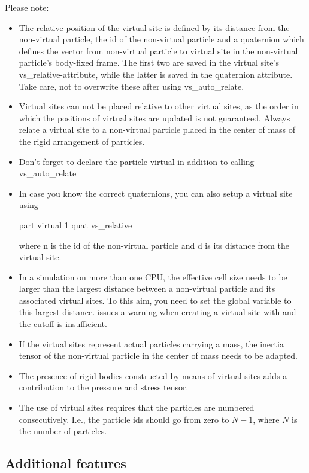 Please note:
\begin{itemize}
\item The relative position of the virtual site is defined by its
  distance from the non-virtual particle, the id of the non-virtual
  particle and a quaternion which defines the vector from non-virtual
  particle to virtual site in the non-virtual particle's body-fixed
  frame. The first two are saved in the virtual site's
  vs\_relative-attribute, while the latter is saved in the quaternion
  attribute. Take care, not to overwrite these after using
  vs\_auto\_relate.
\item Virtual sites can not be placed relative to other virtual sites,
  as the order in which the positions of virtual sites are updated is
  not guaranteed. Always relate a virtual site to a non-virtual
  particle placed in the center of mass of the rigid arrangement of
  particles.
\item Don't forget to declare the particle virtual in addition to
  calling vs\_auto\_relate
\item In case you know the correct quaternions, you can also setup a
  virtual site using
  \begin{essyntaxbox}
    part  virtual 1 quat  vs\_relative  
  \end{essyntaxbox}
  where n is the id of the non-virtual particle and d is its distance
  from the virtual site.
\item In a simulation on more than one CPU, the effective cell size
  needs to be larger than the largest distance between a non-virtual
  particle and its associated virtual sites. To this aim, you need to
  set the global variable  to this largest
  distance. \es issues a warning when creating a virtual site with
   and the cutoff is insufficient.
\item If the virtual sites represent actual particles carrying a mass,
  the inertia tensor of the non-virtual particle in the center of mass
  needs to be adapted.
\item 
The presence of rigid bodies constructed by means of virtual sites adds a contribution to the pressure and stress tensor.
\item
The use of virtual sites requires that the particles are numbered consecutively. I.e., the particle ids should go from zero to $N-1$, where $N$ is the number of particles.
\end{itemize}

\subsection{Additional features}

